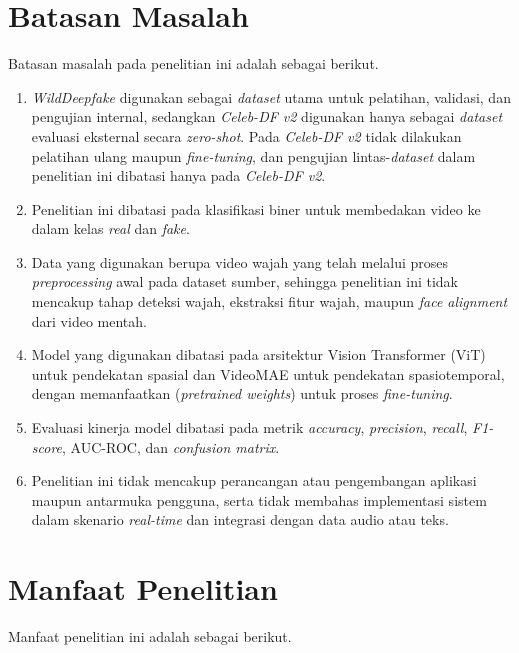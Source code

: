 \section{Batasan Masalah} \label{I.Batasan}
Batasan masalah pada penelitian ini adalah sebagai berikut. \par

\begin{enumerate}[noitemsep]
	\item \textit{WildDeepfake} digunakan sebagai \textit{dataset} utama untuk pelatihan, validasi, dan pengujian internal, sedangkan \textit{Celeb-DF v2} digunakan hanya sebagai \textit{dataset} evaluasi eksternal secara \textit{zero-shot}. Pada \textit{Celeb-DF v2} tidak dilakukan pelatihan ulang maupun \textit{fine-tuning}, dan pengujian lintas-\textit{dataset} dalam penelitian ini dibatasi hanya pada \textit{Celeb-DF v2}.
	\item Penelitian ini dibatasi pada klasifikasi biner untuk membedakan video ke dalam kelas \textit{real} dan \textit{fake}.
	\item Data yang digunakan berupa video wajah yang telah melalui proses \textit{preprocessing} awal pada dataset sumber, sehingga penelitian ini tidak mencakup tahap deteksi wajah, ekstraksi fitur wajah, maupun \textit{face alignment} dari video mentah.
	\item Model yang digunakan dibatasi pada arsitektur Vision Transformer (ViT) untuk pendekatan spasial dan VideoMAE untuk pendekatan spasiotemporal, dengan memanfaatkan (\textit{pretrained weights}) untuk proses \textit{fine-tuning}.
	\item Evaluasi kinerja model dibatasi pada metrik \textit{accuracy}, \textit{precision}, \textit{recall}, \textit{F1-score}, AUC-ROC, dan \textit{confusion matrix}.
	\item Penelitian ini tidak mencakup perancangan atau pengembangan aplikasi maupun antarmuka pengguna, serta tidak membahas implementasi sistem dalam skenario \textit{real-time} dan integrasi dengan data audio atau teks.
\end{enumerate}

\section{Manfaat Penelitian} \label{I.Manfaat}
Manfaat penelitian ini adalah sebagai berikut. \par

